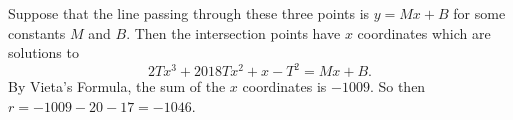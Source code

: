 Suppose that the line passing through these three points is $y=Mx+B$ for some constants $M$ and $B$. Then the intersection points have $x$ coordinates which are solutions to \[2Tx^3+2018Tx^2+x-T^2=Mx+B.\] By Vieta's Formula, the sum of the $x$ coordinates is $-1009$. So then $r=-1009-20-17=\boxed{-1046}$.
